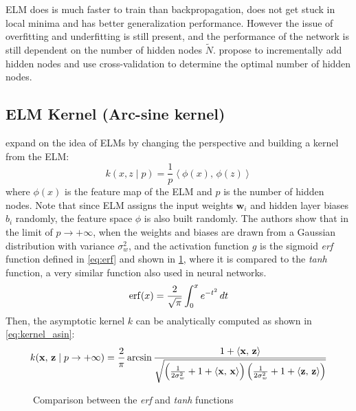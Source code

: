 ELM does is much faster to train than backpropagation, does not get stuck in local minima
and has better generalization performance. However the issue of overfitting and underfitting
is still present, and the performance of the network is still dependent on the number of
hidden nodes $\tilde{N}$. \Textcite{huangExtremeLearningMachine2012} propose to incrementally
add hidden nodes and use cross-validation to determine the optimal number of hidden nodes.

\subsection{ELM Kernel (Arc-sine kernel)}%

\Textcite{frenayParameterinsensitiveKernelExtreme2011} expand on the idea of ELMs \cite{huangExtremeLearningMachine2006,huangExtremeLearningMachine2012}
by changing the perspective and building a kernel from the ELM:
\begin{equation}
    k(x, z \mid p) = \frac{1}{p}\left\langle \phi(x),\,\phi(z) \right\rangle
\end{equation}
where $\phi(x)$ is the feature map of the ELM and $p$ is the number of hidden nodes. Note
that since ELM assigns the input weights $\textbf{w}_i$ and hidden layer biases $b_i$ randomly,
the feature space $\phi$ is also built randomly. The authors show that in the limit of $p \to +\infty$,
when the weights and biases are drawn from a Gaussian distribution with variance $\sigma_w^2$, and
the activation function $g$ is the sigmoid \emph{erf} function defined in \cref{eq:erf} and shown in
\cref{fig:erf}, where it is compared to the \emph{tanh} function, a very similar function also
used in neural networks.
\begin{equation}\label{eq:erf}
    \operatorname{erf}(x) = \frac{2}{\sqrt{\pi}} \int_0^x e^{-t^2} \,dt
\end{equation}
Then, the
asymptotic kernel $k$ can be analytically computed as shown in \cref{eq:kernel_asin}:
\begin{equation}\label{eq:kernel_asin}
	k(\mathbf{x},\,\mathbf{z} \mid p \to + \infty)  = \frac{2}{\pi}
	\arcsin \frac{1 + \left\langle \mathbf{x},\,\mathbf{z} \right\rangle}{\sqrt{
			\left(
			\frac{1}{2\sigma_w^2} + 1 + \left\langle \mathbf{x},\,\mathbf{x} \right\rangle
			\right)
			\left(
			\frac{1}{2\sigma_w^2} + 1 + \left\langle \mathbf{z},\,\mathbf{z} \right\rangle
			\right)
		}}
\end{equation}

\begin{figure}[htpb]
\caption{Comparison between the \emph{erf} and \emph{tanh} functions}
\label{fig:erf}
\end{figure}

